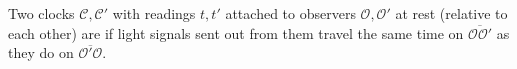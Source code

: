 \begin{defi}\label{defi:einstein_synchrony}
	Two clocks $\mathcal{C}, \mathcal{C}'$ with readings $t, t'$ attached to observers $\mathcal{O}, \mathcal{O}'$ at rest (relative to each other) are  if light signals sent out from them travel the same time on $\overline{\mathcal{O} \mathcal{O}'}$ as they do on $\overline{\mathcal{O}' \mathcal{O}}$.
\end{defi}

